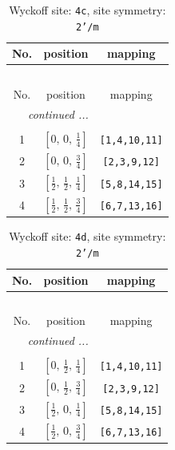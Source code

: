 \documentclass[fleqn,8pt]{jsarticle}
\begin{document}
\renewcommand{\arraystretch}{1.2}
\begin{longtable}{ccc}
\caption{Wyckoff site: {\tt 4c}, site symmetry: {\tt 2'/m}}
 \\
 \hline \hline
No. & position & mapping \\ \hline \endfirsthead

\multicolumn{2}{l}{\tablename\ \thetable{}} \\
 \hline \hline
No. & position & mapping \\ \hline \endhead

 \hline \hline
\multicolumn{2}{r}{\footnotesize\it continued ...} \\ \endfoot

 \hline \hline
\multicolumn{2}{r}{} \\ \endlastfoot

1 & $\left[ 0,\, 0,\, \frac{1}{4} \right]$ & {\tt [1,4,10,11]} \\ \hline
2 & $\left[ 0,\, 0,\, \frac{3}{4} \right]$ & {\tt [2,3,9,12]} \\ \hline
3 & $\left[ \frac{1}{2},\, \frac{1}{2},\, \frac{1}{4} \right]$ & {\tt [5,8,14,15]} \\ \hline
4 & $\left[ \frac{1}{2},\, \frac{1}{2},\, \frac{3}{4} \right]$ & {\tt [6,7,13,16]} \\
\end{longtable}
\renewcommand{\arraystretch}{1.2}
\begin{longtable}{ccc}
\caption{Wyckoff site: {\tt 4d}, site symmetry: {\tt 2'/m}}
 \\
 \hline \hline
No. & position & mapping \\ \hline \endfirsthead

\multicolumn{2}{l}{\tablename\ \thetable{}} \\
 \hline \hline
No. & position & mapping \\ \hline \endhead

 \hline \hline
\multicolumn{2}{r}{\footnotesize\it continued ...} \\ \endfoot

 \hline \hline
\multicolumn{2}{r}{} \\ \endlastfoot

1 & $\left[ 0,\, \frac{1}{2},\, \frac{1}{4} \right]$ & {\tt [1,4,10,11]} \\ \hline
2 & $\left[ 0,\, \frac{1}{2},\, \frac{3}{4} \right]$ & {\tt [2,3,9,12]} \\ \hline
3 & $\left[ \frac{1}{2},\, 0,\, \frac{1}{4} \right]$ & {\tt [5,8,14,15]} \\ \hline
4 & $\left[ \frac{1}{2},\, 0,\, \frac{3}{4} \right]$ & {\tt [6,7,13,16]} \\
\end{longtable}
\end{document}
